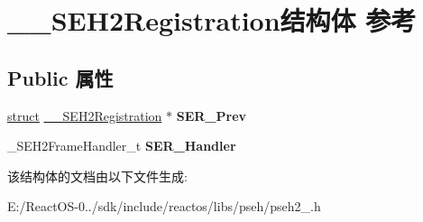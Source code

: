\hypertarget{struct_____s_e_h2_registration}{}\section{\+\_\+\+\_\+\+S\+E\+H2\+Registration结构体 参考}
\label{struct_____s_e_h2_registration}
\subsection*{Public 属性}
\begin{DoxyCompactItemize}
\item 
\mbox{\label{struct_____s_e_h2_registration_a6b7f59aff12bfb65f328ece18e2a7fc5}} 
\hyperlink{interfacestruct}{struct} \hyperlink{struct_____s_e_h2_registration}{\+\_\+\+\_\+\+S\+E\+H2\+Registration} $\ast$ {\bfseries S\+E\+R\+\_\+\+Prev}
\item 
\mbox{\label{struct_____s_e_h2_registration_a96e4f06df6891c8f1a0e225b49013896}} 
\+\_\+\+S\+E\+H2\+Frame\+Handler\+\_\+t {\bfseries S\+E\+R\+\_\+\+Handler}
\end{DoxyCompactItemize}


该结构体的文档由以下文件生成\+:\begin{DoxyCompactItemize}
\item 
E\+:/\+React\+O\+S-\/0../sdk/include/reactos/libs/pseh/pseh2\+\_.\+h\end{DoxyCompactItemize}
